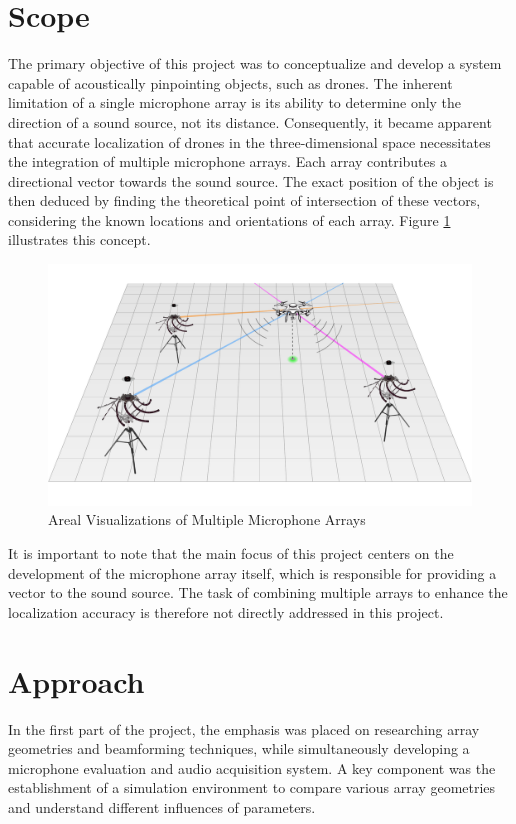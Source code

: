 \section{Scope}
The primary objective of this project was to conceptualize and develop a system capable of acoustically pinpointing objects, such as drones.
The inherent limitation of a single microphone array is its ability to determine only the direction of a sound source, not its distance.
Consequently, it became apparent that accurate localization of drones in the three-dimensional space necessitates the integration of multiple microphone arrays.
Each array contributes a directional vector towards the sound source.
The exact position of the object is then deduced by finding the theoretical point of intersection of these vectors, considering the known locations and orientations of each array.
Figure \ref{fig:areal_overview_diagram} illustrates this concept.
\begin{figure}[h!]
	\centering
	\includegraphics[width=1.0\textwidth, trim={0 -0.1cm 0 -0.3cm}]{images/1_introduction/areal_overview_diagram_2.pdf}
	\caption{Areal Visualizations of Multiple Microphone Arrays}
	\label{fig:areal_overview_diagram}
\end{figure}

It is important to note that the main focus of this project centers on the development of the microphone array itself,
which is responsible for providing a vector to the sound source.
The task of combining multiple arrays to enhance the localization accuracy is therefore not directly addressed in this project.

\newpage
\section{Approach}
In the first part of the project, the emphasis was placed on researching array geometries and beamforming techniques,
while simultaneously developing a microphone evaluation and audio acquisition system.
A key component was the establishment of a simulation environment to compare various array geometries and understand different influences of parameters.

